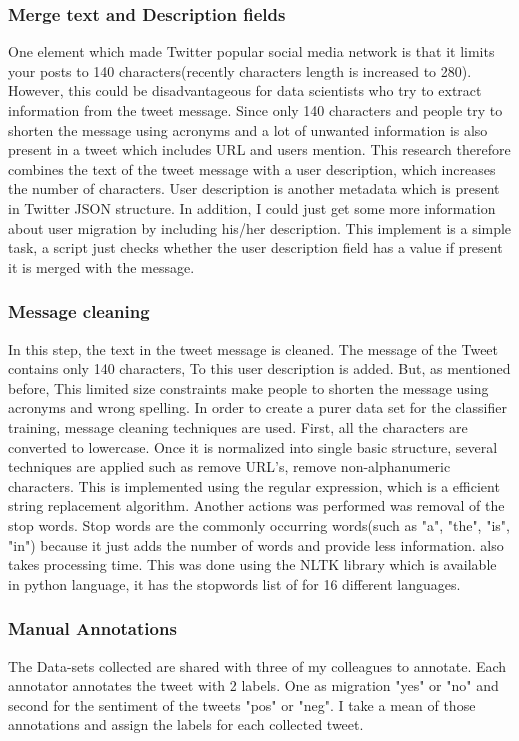 \subsubsection{Merge text and Description fields}

One element which made Twitter popular social media network is that it limits your posts to 140 characters(recently characters length is increased to 280). However, this could be disadvantageous for data scientists who try to extract information from the tweet message. Since only 140 characters and people try to shorten the message using acronyms and a lot of unwanted information is also present in a tweet which includes URL and users mention. This research therefore combines the text of the tweet message with a user description, which increases the number of characters. User description is another metadata which is present in Twitter JSON structure. In addition, I could just get some more information about user migration by including his/her description. This implement is a simple task, a script just checks whether the user description field has a value if present it is merged with the message.

\subsubsection{Message cleaning}
In this step, the text in the tweet message is cleaned. The message of the Tweet contains only 140 characters, To this user description is added. But, as mentioned before, This limited size constraints make people to shorten the message using acronyms and wrong spelling. 
In order to create a purer data set for the classifier training, message cleaning techniques are used. First, all the characters are converted to lowercase. Once it is normalized into single basic structure, several techniques are applied such as remove URL's, remove non-alphanumeric characters. This is implemented using the regular expression, which is a efficient string replacement algorithm. Another actions was performed was removal of the stop words. Stop words are the commonly occurring words(such as "a", "the", "is", "in") because it just adds the number of words and provide less information. also takes processing time. This was done using the NLTK library which is available in python language, it has the stopwords list of for 16 different languages. 
\subsubsection{Manual Annotations}
The Data-sets collected are shared with three of my colleagues to annotate. Each annotator annotates the tweet with 2 labels. One as migration "yes" or "no" and second for the sentiment of the tweets "pos" or "neg". I take a mean of those annotations and assign the labels for each collected tweet.

